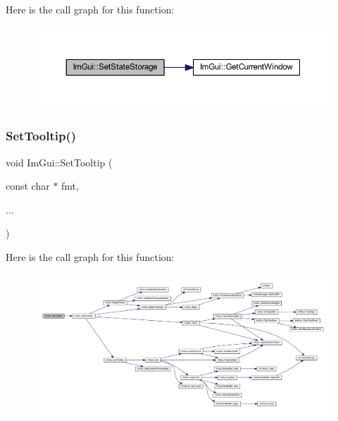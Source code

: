Here is the call graph for this function\+:
\nopagebreak
\begin{figure}[H]
\begin{center}
\leavevmode
\includegraphics[width=350pt]{namespace_im_gui_a5ba1bf82e3ecdd09dcb6ad733bcf5726_cgraph}
\end{center}
\end{figure}
\mbox{\label{namespace_im_gui_a313073fa01b8a9791f241ef93091ce92}} 
\subsubsection{\texorpdfstring{Set\+Tooltip()}{SetTooltip()}}
{\footnotesize\ttfamily void Im\+Gui\+::\+Set\+Tooltip (\begin{DoxyParamCaption}\item[{const char $\ast$}]{fmt,  }\item[{}]{... }\end{DoxyParamCaption})}

Here is the call graph for this function\+:
\nopagebreak
\begin{figure}[H]
\begin{center}
\leavevmode
\includegraphics[width=350pt]{namespace_im_gui_a313073fa01b8a9791f241ef93091ce92_cgraph}
\end{center}
\end{figure}
\mbox{\label{namespace_im_gui_a3826acf68fc4a12bb66401575f51d6a2}} 
